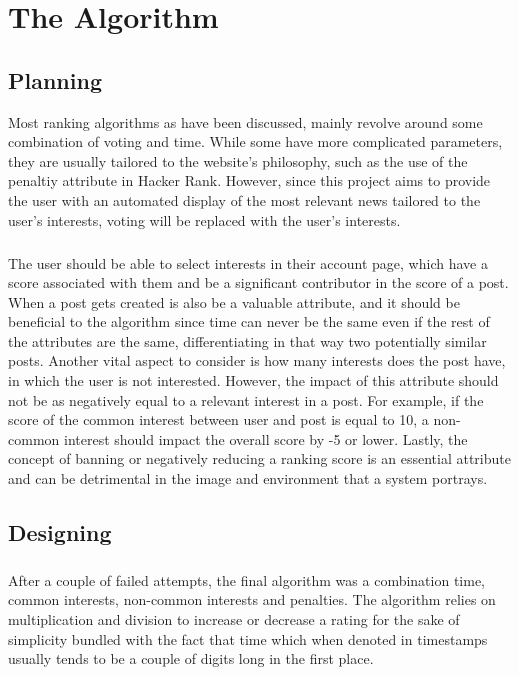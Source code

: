 \chapter {The Algorithm}

\section{Planning}

Most ranking algorithms as have been discussed, mainly revolve around some combination of voting and time. While some have more complicated parameters, they are usually tailored to the website's philosophy, such as the use of  the penaltiy attribute in Hacker Rank. However, since this project aims to provide the user with an automated display of the most relevant news tailored to the user's interests, voting will be replaced with the user's interests.
\paragraph{}
The user should be able to select interests in their account page, which have a score associated with them and be a significant contributor in the score of a post. When a post gets created is also be a valuable attribute, and it should be beneficial to the algorithm since time can never be the same even if the rest of the attributes are the same, differentiating in that way two potentially similar posts. Another vital aspect to consider is how many interests does the post have, in which the user is not interested. However, the impact of this attribute should not be as negatively equal to a relevant interest in a post. For example, if the score of the common interest between user and post is equal to 10, a non-common interest should impact the overall score by -5 or lower. Lastly, the concept of banning or negatively reducing a ranking score is an essential attribute and can be detrimental in the image and environment that a system portrays.

\section {Designing}

\paragraph{}

After a couple of failed attempts, the final algorithm was a combination time, common interests, non-common interests and penalties. The algorithm relies on multiplication and division to increase or decrease a rating for the sake of simplicity bundled with the fact that time which when denoted in timestamps usually tends to be a couple of digits long in the first place.


